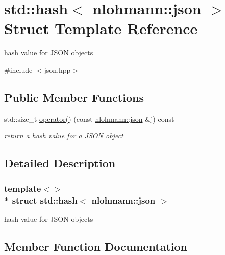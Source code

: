 \hypertarget{structstd_1_1hash_3_01nlohmann_1_1json_01_4}{}\section{std\+:\+:hash$<$ nlohmann\+:\+:json $>$ Struct Template Reference}
\label{structstd_1_1hash_3_01nlohmann_1_1json_01_4}


hash value for J\+S\+ON objects  




{\ttfamily \#include $<$json.\+hpp$>$}

\subsection*{Public Member Functions}
\begin{DoxyCompactItemize}
\item 
std\+::size\+\_\+t \hyperlink{structstd_1_1hash_3_01nlohmann_1_1json_01_4_afd03f6ad53db22868ca4163a8200b2f9}{operator()} (const \hyperlink{namespacenlohmann_a2bfd99e845a2e5cd90aeaf1b1431f474}{nlohmann\+::json} \&j) const 
\begin{DoxyCompactList}\small\item\em return a hash value for a J\+S\+ON object \end{DoxyCompactList}\end{DoxyCompactItemize}


\subsection{Detailed Description}
\subsubsection*{template$<$$>$\\*
struct std\+::hash$<$ nlohmann\+::json $>$}

hash value for J\+S\+ON objects 

\subsection{Member Function Documentation}
